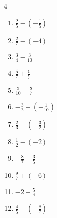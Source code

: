 \begin{multicols}{4}
\begin{enumerate}
  \item $\displaystyle \frac{2}{5} - \left(-\frac{1}{5}\right)$


  \item $\displaystyle \frac{2}{7} - \left(-4\right)$


  \item $\displaystyle \frac{3}{4} - \frac{3}{10}$


  \item $\displaystyle \frac{5}{7} + \frac{4}{5}$


  \item $\displaystyle \frac{9}{10} - \frac{8}{7}$


  \item $\displaystyle -\frac{3}{2} - \left(-\frac{1}{10}\right)$


\columnbreak %

  \item $\displaystyle \frac{2}{3} - \left(-\frac{3}{2}\right)$


  \item $\displaystyle \frac{1}{2} - \left(-2\right)$


  \item $\displaystyle -\frac{8}{7} + \frac{3}{5}$


  \item $\displaystyle \frac{9}{7} + \left(-6\right)$


  \item $\displaystyle -2 + \frac{5}{4}$


  \item $\displaystyle \frac{4}{5} - \left(-\frac{8}{7}\right)$


\end{enumerate}
\end{multicols}
